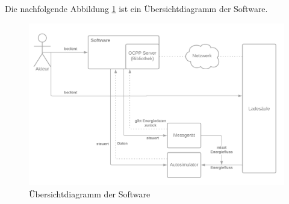 Die nachfolgende Abbildung \ref{fig:summaryDiagrammLibrary} ist ein Übersichtdiagramm der Software.
\begin{figure}[H]
    \centering
    \includegraphics[width=1\textwidth]{./images/ERK.png}
    \caption[Übersichtdiagramm der Software]{Übersichtdiagramm der Software}
    \label{fig:summaryDiagrammLibrary}
\end{figure}